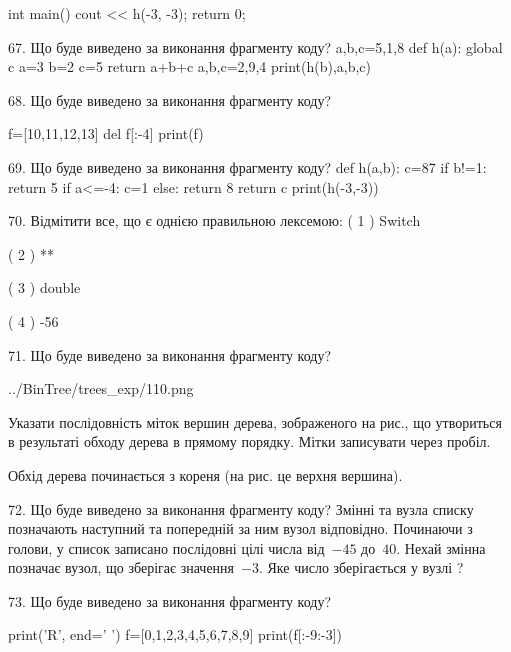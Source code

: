 \documentclass[11pt]{article}
\begin{document}
int main(){
    cout << h(-3, -3);
    return 0;
}


67. Що буде виведено за виконання фрагменту коду?
a,b,c=5,1,8
   def h(a):
     global c     a=3
     b=2
     c=5
     return a+b+c
   a,b,c=2,9,4
   print(h(b),a,b,c)

68. Що буде виведено за виконання фрагменту коду?

f=[10,11,12,13]
del f[:-4]
print(f)



69. Що буде виведено за виконання фрагменту коду?
def h(a,b):
      c=87
      if b!=1: return 5
      if a<=-4: c=1
      else: return 8
      return c
   print(h(-3,-3))

70. %
Відмітити все, що є однією правильною лексемою:
( 1 ) Switch

( 2 ) **

( 3 ) double

( 4 ) -56


71. Що буде виведено за виконання фрагменту коду?

\begin{center}
	{../BinTree/trees_exp/110.png}
\end{center}
Указати послідовність міток вершин дерева, зображеного на рис., що утвориться в результаті обходу дерева в прямому порядку. Мітки записувати через пробіл.\par Обхід дерева починається з кореня (на рис. це верхня вершина).


72. Що буде виведено за виконання фрагменту коду?
Змінні  та  вузла списку позначають наступний та попередній за ним вузол відповідно. Починаючи з голови, у список записано послідовні цілі числа від~$-45$ до~$40$. Нехай змінна  позначає вузол, що зберігає значення~$-3$.
Яке число зберігається у вузлі  ?


73. Що буде виведено за виконання фрагменту коду?

print('R', end=' ')
f=[0,1,2,3,4,5,6,7,8,9]
print(f[:-9:-3])


\end{document}
